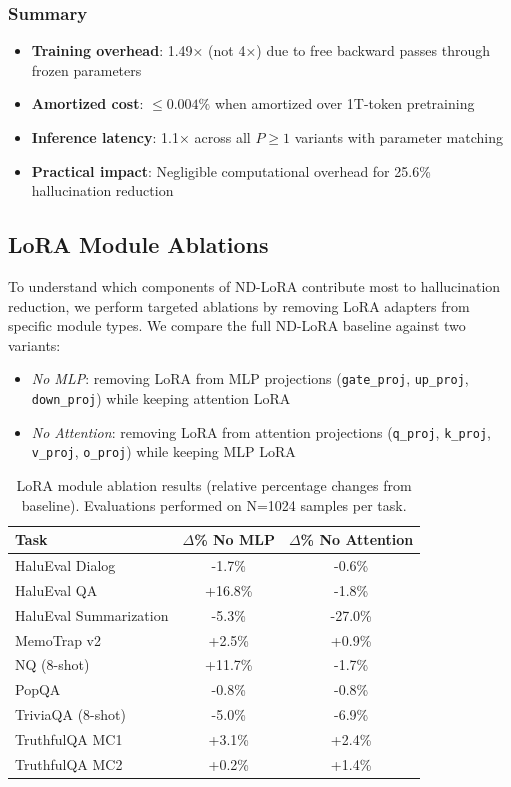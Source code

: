 \documentclass{article} %
\begin{document}
\subsubsection{Summary}

\begin{itemize}
  \item \textbf{Training overhead}: 1.49× (not 4×) due to free backward passes through frozen parameters
  \item \textbf{Amortized cost}: $\leq0.004\%$ when amortized over 1T-token pretraining
  \item \textbf{Inference latency}: 1.1× across all $P \ge 1$ variants with parameter matching
  \item \textbf{Practical impact}: Negligible computational overhead for 25.6\% hallucination reduction
\end{itemize}

\subsection{LoRA Module Ablations}
\label{sec:lora_ablations}

To understand which components of ND-LoRA contribute most to hallucination reduction, we perform targeted
ablations by removing LoRA adapters from specific module types. We compare the full ND-LoRA baseline against
two variants:
\begin{itemize}
  \item \emph{No MLP}: removing LoRA from MLP projections (\texttt{gate\_proj}, \texttt{up\_proj},
    \texttt{down\_proj}) while keeping attention LoRA
  \item \emph{No Attention}: removing LoRA from attention projections (\texttt{q\_proj}, \texttt{k\_proj},
    \texttt{v\_proj}, \texttt{o\_proj}) while keeping MLP LoRA
\end{itemize}

\begin{table}[htbp]
  \centering
  \begin{tabular}{l|cc}
    \textbf{Task} & \textbf{$\Delta$\% No MLP} & \textbf{$\Delta$\% No Attention} \\
    \hline
    HaluEval Dialog & -1.7\% & -0.6\% \\
    HaluEval QA & +16.8\% & -1.8\% \\
    HaluEval Summarization & -5.3\% & -27.0\% \\
    MemoTrap v2 & +2.5\% & +0.9\% \\
    NQ (8-shot) & +11.7\% & -1.7\% \\
    PopQA & -0.8\% & -0.8\% \\
    TriviaQA (8-shot) & -5.0\% & -6.9\% \\
    TruthfulQA MC1 & +3.1\% & +2.4\% \\
    TruthfulQA MC2 & +0.2\% & +1.4\% \\
  \end{tabular}
  \caption{
    LoRA module ablation results (relative percentage changes from baseline). Evaluations performed on N=1024
    samples per task.
  }
  \label{tab:lora_ablations_delta_pct}
\end{table}
\end{document}
